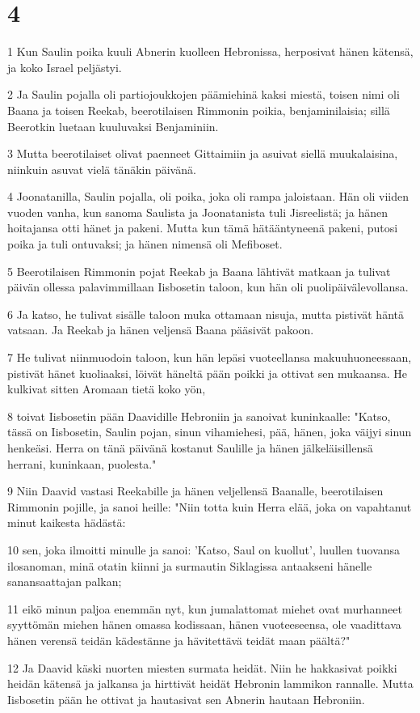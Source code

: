 \chapter{4}

\par 1 Kun Saulin poika kuuli Abnerin kuolleen Hebronissa, herposivat hänen kätensä, ja koko Israel peljästyi.
\par 2 Ja Saulin pojalla oli partiojoukkojen päämiehinä kaksi miestä, toisen nimi oli Baana ja toisen Reekab, beerotilaisen Rimmonin poikia, benjaminilaisia; sillä Beerotkin luetaan kuuluvaksi Benjaminiin.
\par 3 Mutta beerotilaiset olivat paenneet Gittaimiin ja asuivat siellä muukalaisina, niinkuin asuvat vielä tänäkin päivänä.
\par 4 Joonatanilla, Saulin pojalla, oli poika, joka oli rampa jaloistaan. Hän oli viiden vuoden vanha, kun sanoma Saulista ja Joonatanista tuli Jisreelistä; ja hänen hoitajansa otti hänet ja pakeni. Mutta kun tämä hätääntyneenä pakeni, putosi poika ja tuli ontuvaksi; ja hänen nimensä oli Mefiboset.
\par 5 Beerotilaisen Rimmonin pojat Reekab ja Baana lähtivät matkaan ja tulivat päivän ollessa palavimmillaan Iisbosetin taloon, kun hän oli puolipäivälevollansa.
\par 6 Ja katso, he tulivat sisälle taloon muka ottamaan nisuja, mutta pistivät häntä vatsaan. Ja Reekab ja hänen veljensä Baana pääsivät pakoon.
\par 7 He tulivat niinmuodoin taloon, kun hän lepäsi vuoteellansa makuuhuoneessaan, pistivät hänet kuoliaaksi, löivät häneltä pään poikki ja ottivat sen mukaansa. He kulkivat sitten Aromaan tietä koko yön,
\par 8 toivat Iisbosetin pään Daavidille Hebroniin ja sanoivat kuninkaalle: "Katso, tässä on Iisbosetin, Saulin pojan, sinun vihamiehesi, pää, hänen, joka väijyi sinun henkeäsi. Herra on tänä päivänä kostanut Saulille ja hänen jälkeläisillensä herrani, kuninkaan, puolesta."
\par 9 Niin Daavid vastasi Reekabille ja hänen veljellensä Baanalle, beerotilaisen Rimmonin pojille, ja sanoi heille: "Niin totta kuin Herra elää, joka on vapahtanut minut kaikesta hädästä:
\par 10 sen, joka ilmoitti minulle ja sanoi: 'Katso, Saul on kuollut', luullen tuovansa ilosanoman, minä otatin kiinni ja surmautin Siklagissa antaakseni hänelle sanansaattajan palkan;
\par 11 eikö minun paljoa enemmän nyt, kun jumalattomat miehet ovat murhanneet syyttömän miehen hänen omassa kodissaan, hänen vuoteeseensa, ole vaadittava hänen verensä teidän kädestänne ja hävitettävä teidät maan päältä?"
\par 12 Ja Daavid käski nuorten miesten surmata heidät. Niin he hakkasivat poikki heidän kätensä ja jalkansa ja hirttivät heidät Hebronin lammikon rannalle. Mutta Iisbosetin pään he ottivat ja hautasivat sen Abnerin hautaan Hebroniin.

